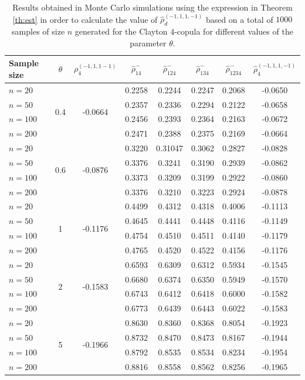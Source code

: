 \documentclass[11pt,a4paper]{article}
\begin{document}
 \begin{table}[t]
\begin{center}
\begin{tabular}{ l c  c  c c c c c }
\hline
Sample size &$\theta$ & $\rho_4^{(-1,1,1-1)}$ & $\widehat{\rho}_{14}^-$ & $\widehat{\rho}_{124}^-$& $\widehat{\rho}_{134}^-$& $\widehat{\rho}_{1234}^-$ & $\widehat{\rho}_{4}^{(-1,1,1,-1)}$  \\ \hline
$n=20$& \multirow {4}{*}{0.4} & \multirow{4}{*}{-0.0664} & 0.2258 & 0.2244 & 0.2247 & 0.2068  & -0.0650 \\
$n=50$&  &  & 0.2357 & 0.2336 & 0.2294 & 0.2122  & -0.0658 \\
$n=100$&  &  & 0.2456 & 0.2393 & 0.2364 & 0.2163  & -0.0672 \\
$n=200$&  &  & 0.2471 & 0.2388 & 0.2375 & 0.2169  & -0.0664 \\
$n=20$ & \multirow{4}{*}{0.6} & \multirow{4}{*}{-0.0876} &  0.3220 & 0.31047  & 0.3062 & 0.2827  & -0.0828  \\
$n=50$ &  &  & 0.3376  & 0.3241 & 0.3190 & 0.2939  & -0.0862  \\
$n=100$ &  &  & 0.3373  & 0.3209  & 0.3199 & 0.2922  & -0.0860  \\
$n=200$ &  &  & 0.3376  & 0.3210  & 0.3223 & 0.2924  & -0.0878  \\
$n=20$ & \multirow{4}{*}{1} & \multirow{4}{*}{-0.1176}  &  0.4499 & 0.4312 & 0.4318 & 0.4006 & -0.1113 \\
$n=50$ &  &   &  0.4645 & 0.4441 & 0.4448 & 0.4116 & -0.1149 \\
$n=100$ &  &   & 0.4754  & 0.4510 & 0.4511 & 0.4140 & -0.1179 \\
$n=200$ &  &   & 0.4765 & 0.4520 & 0.4522 & 0.4156 & -0.1176 \\
$n=20$ & \multirow{4}{*}{2} & \multirow{4}{*}{-0.1583}  & 0.6593 & 0.6309  & 0.6312 & 0.5934 & -0.1545 \\
$n=50$ &  &   & 0.6680 & 0.6374  & 0.6350 & 0.5949 & -0.1570 \\
$n=100$ &  &   & 0.6743 & 0.6412  & 0.6418 & 0.6000 & -0.1582 \\
$n=200$ &  &   & 0.6773 & 0.6439  & 0.6443 & 0.6022 & -0.1583 \\
$n=20$ & \multirow{4}{*}{5} & \multirow{4}{*}{-0.1966} & 0.8630 & 0.8360 & 0.8368 & 0.8054 & -0.1923 \\ 
$n=50$ & & & 0.8732 & 0.8470 & 0.8473 & 0.8167 & -0.1944 \\ 
$n=100$ & & & 0.8792 & 0.8535 & 0.8534 & 0.8234 & -0.1954 \\ 
$n=200$ & & & 0.8816 & 0.8558 & 0.8562 & 0.8256 & -0.1965 \\ 
\hline
\end{tabular}
\caption{Results obtained in Monte Carlo simulations using the expression in Theorem \ref{th:est} in order to calculate the value of $\widehat{\rho}_d^{(-1,1,1,-1)}$ based on a total of $1000$ samples of size $n$ generated for the Clayton $4$-copula for different values of the parameter $\theta$.}
\label{tab:4}
\end{center}
\end{table}
\end{document}
